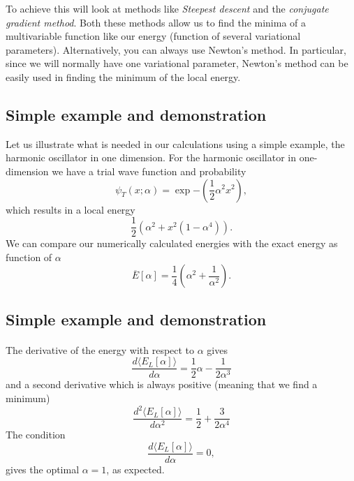 \documentclass[%
oneside,                 %
final,                   %
10pt]{article}
\begin{document}
\noindent
To achieve this will look at methods like \emph{Steepest descent} and the \emph{conjugate gradient method}. Both these methods allow us to find
the minima of a multivariable  function like our energy (function of several variational parameters). 
Alternatively, you can always use Newton's method. In particular, since we will normally have one variational parameter,
Newton's method can be easily used in finding the minimum of the local energy.



\subsection*{Simple example and demonstration}

Let us illustrate what is needed in our calculations using a simple example, the harmonic oscillator in one dimension.
For the harmonic oscillator in one-dimension we have a  trial wave function and probability
\[
\psi_T(x;\alpha) = \exp{-(\frac{1}{2}\alpha^2x^2)},
\]
which results in a local energy 
\[
\frac{1}{2}\left(\alpha^2+x^2(1-\alpha^4)\right).
\]
We can compare our numerically calculated energies with the exact energy as function of $\alpha$
\[
\overline{E}[\alpha] = \frac{1}{4}\left(\alpha^2+\frac{1}{\alpha^2}\right).
\]

\subsection*{Simple example and demonstration}

\paragraph{}
The derivative of the energy with respect to $\alpha$ gives
\begin{equation*}
\frac{d\langle  E_L[\alpha]\rangle}{d\alpha} = \frac{1}{2}\alpha-\frac{1}{2\alpha^3}
\end{equation*}
and a second derivative which is always positive (meaning that we find a minimum)
\begin{equation*}
\frac{d^2\langle  E_L[\alpha]\rangle}{d\alpha^2} = \frac{1}{2}+\frac{3}{2\alpha^4}
\end{equation*}
The condition
\begin{equation*}
\frac{d\langle  E_L[\alpha]\rangle}{d\alpha} = 0,
\end{equation*}
gives the optimal $\alpha=1$, as expected.
\end{document}
